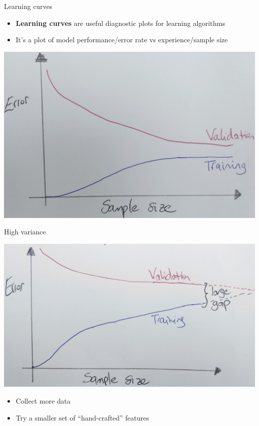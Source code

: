 \documentclass[pdf]{beamer}
\begin{document}
\begin{frame}{Learning curves}
\begin{itemize}\addtolength{\itemsep}{0.5\baselineskip}
	\item \textbf{Learning curves} are useful diagnostic plots for learning algorithms
	\item It's a plot of model performance/error rate vs experience/sample size
\end{itemize} 
\vfill
\begin{center}
		\includegraphics[width=.75\textwidth]{learningcurve.jpg}
\end{center}
\end{frame}

\begin{frame}{High variance}
\begin{center}
		\includegraphics[width=.75\textwidth]{learningcurvevariance.jpg}
\end{center}
\begin{itemize}\addtolength{\itemsep}{0.5\baselineskip}
	\item<2-> Collect more data
	\item<3-> Try a smaller set of ``hand-crafted'' features
\end{itemize} 
\end{frame}
\end{document}
